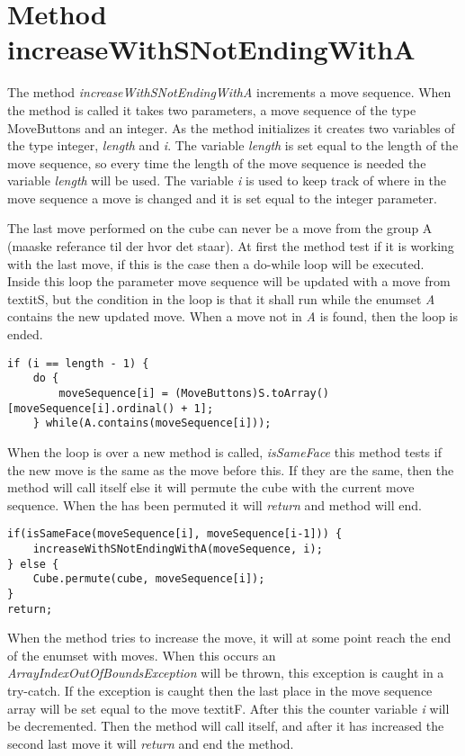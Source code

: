 \section{Method increaseWithSNotEndingWithA}

The method \textit{increaseWithSNotEndingWithA} increments a move sequence.
When the method is called it takes two parameters, a move sequence of the type MoveButtons and an integer.
As the method initializes it creates two variables of the type integer, \textit{length} and \textit{i}.
The variable \textit{length} is set equal to the length of the move sequence, so every time the length of the move sequence is needed the variable \textit{length} will be used.
The variable \textit{i} is used to keep track of where in the move sequence a move is changed and it is set equal to the integer parameter. 

The last move performed on the cube can never be a move from the group A (maaske referance til der hvor det staar).
At first the method test if it is working with the last move, if this is the case then a do-while loop will be executed.
Inside this loop the parameter move sequence will be updated with a move from textit{S}, but the condition in the loop is that it shall run while the enumset \textit{A} contains the new updated move.
When a move not in \textit{A} is found, then the loop is ended.

\begin{verbatim}
if (i == length - 1) {
	do {
		moveSequence[i] = (MoveButtons)S.toArray()[moveSequence[i].ordinal() + 1];
	} while(A.contains(moveSequence[i]));
\end{verbatim}

When the loop is over a new method is called, \textit{isSameFace} this method tests if the new move is the same as the move before this.
If they are the same, then the method will call itself else it will permute the cube with the current move sequence.
When the \rubik{} has been permuted it will \textit{return} and method will end.

\begin{verbatim}
if(isSameFace(moveSequence[i], moveSequence[i-1])) {
	increaseWithSNotEndingWithA(moveSequence, i);
} else {
	Cube.permute(cube, moveSequence[i]);
}
return;
\end{verbatim}

When the method tries to increase the move, it will at some point reach the end of the enumset with moves.
When this occurs an \textit{ArrayIndexOutOfBoundsException} will be thrown, this exception is caught in a try-catch.
If the exception is caught then the last place in the move sequence array will be set equal to the move textit{F}.
After this the counter variable \textit{i} will be decremented.
Then the method will call itself, and after it has increased the second last move it will \textit{return} and end the method.

